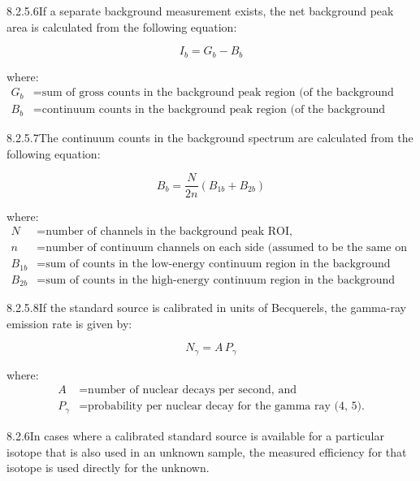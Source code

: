 \documentclass[12pt]{article}
\begin{document}
8.2.5.6\quad If a separate background measurement exists, the net background peak area is
calculated from the following equation:

\begin{equation}
  I_b = G_b - B_b
  \label{eq:net_bg_area}
\end{equation}

\noindent where:
\begin{align*}
  G_b &= \text{sum of gross counts in the background peak region (of the background spectrum), and}\\
  B_b &= \text{continuum counts in the background peak region (of the background spectrum).}
\end{align*}

8.2.5.7\quad The continuum counts in the background spectrum are calculated from the
following equation:

\begin{equation}
  B_b = \frac{N}{2n}\!\left(B_{1b} + B_{2b}\right)
  \label{eq:bg_continuum}
\end{equation}

\noindent where:
\begin{align*}
  N     &= \text{number of channels in the background peak ROI,}\\
  n     &= \text{number of continuum channels on each side (assumed to be the same on both sides),}\\
  B_{1b}&= \text{sum of counts in the low-energy continuum region in the background spectrum, and}\\
  B_{2b}&= \text{sum of counts in the high-energy continuum region in the background spectrum.}
\end{align*}

8.2.5.8\quad If the standard source is calibrated in units of Becquerels, the gamma-ray
emission rate is given by:

\begin{equation}
  N_\gamma = A\,P_\gamma
  \label{eq:emission_rate}
\end{equation}

\noindent where:
\begin{align*}
  A       &= \text{number of nuclear decays per second, and}\\
  P_\gamma &= \text{probability per nuclear decay for the gamma ray~(4, 5).}
\end{align*}

8.2.6\quad In cases where a calibrated standard source is available for a particular
isotope that is also used in an unknown sample, the measured efficiency for that isotope
is used directly for the unknown.
\end{document}
